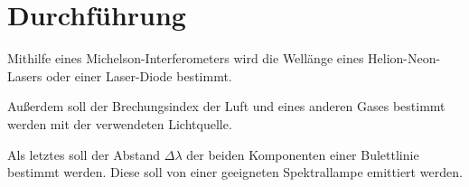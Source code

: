 \section{Durchführung}
\label{sec:Durchführung}

Mithilfe eines Michelson-Interferometers wird die Wellänge eines Helion-Neon-Lasers oder einer Laser-Diode bestimmt. 

Außerdem soll der Brechungsindex der Luft und eines anderen Gases bestimmt werden mit der verwendeten Lichtquelle. 

Als letztes soll der Abstand $\Delta \lambda$ der beiden Komponenten einer Bulettlinie bestimmt werden. Diese soll von einer geeigneten Spektrallampe emittiert werden. 

